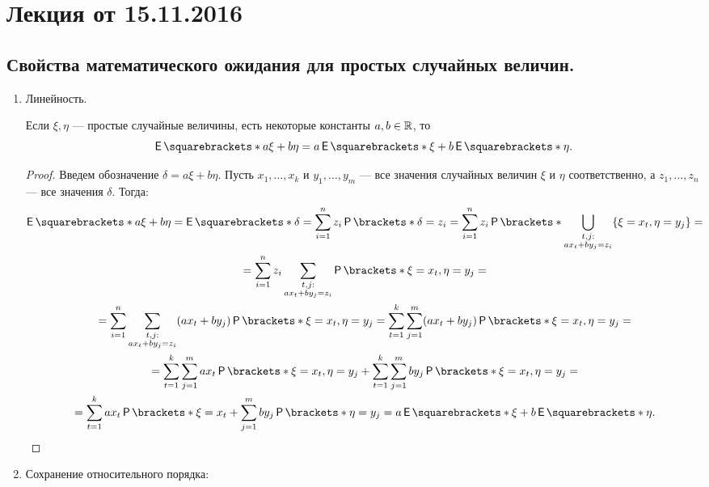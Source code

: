 \section {Лекция от 15.11.2016}

\subsection{Свойства математического ожидания для простых случайных величин.}

\begin{enumerate}
    \item Линейность. \par
    Если $ \xi, \eta $ --- простые случайные величины, есть некоторые константы $ a, b \in \mathbb{R} $, то 
    \[
        \E{a\xi + b\eta} = a\E{\xi} + b\E{\eta}.
    \] 
        \begin{proof}
            Введем обозначение \(\delta = a\xi + b\eta \).
            Пусть \(x_1, \ldots, x_k \) и \(y_1, \ldots, y_m \) --- все значения случайных величин $ \xi $ и $ \eta $ соответственно, а \(z_1, \ldots, z_n \) --- все значения $ \delta $. Тогда:
            \begin{multline*}
                \E{a\xi + b\eta} = \E{\delta} = \sum\limits_{i = 1}^{n}z_i\Pr{\delta = z_i} = \sum\limits_{i = 1}^{n}z_i
                \Pr{\bigcup\limits_{\substack{t, j:\\ ax_t + by_j = z_i}}\{\xi = x_t, \eta = y_j \}} = \\ =
                \sum\limits_{i = 1}^{n}z_i\sum\limits_{\substack{t, j:\\ ax_t + by_j = z_i}}\Pr{\xi = x_t, \eta = y_j} = \\ =
                \sum\limits_{i = 1}^{n}\sum\limits_{\substack{t, j:\\ ax_t + by_j = z_i}}(ax_t + by_j)\Pr{\xi = x_t, \eta = y_j} = 
                \sum\limits_{t = 1}^{k}\sum\limits_{j = 1}^{m}(ax_t + by_j)\Pr{\xi = x_t, \eta = y_j} = \\ =
                \sum\limits_{t = 1}^{k}\sum\limits_{j = 1}^{m}ax_t\Pr{\xi = x_t, \eta = y_j} +
                \sum\limits_{t = 1}^{k}\sum\limits_{j = 1}^{m}by_j\Pr{\xi = x_t, \eta = y_j} = \\ =
                \sum\limits_{t = 1}^{k}ax_t\Pr{\xi = x_t} + \sum\limits_{j = 1}^{m}by_j\Pr{\eta = y_j} = a\E{\xi} + b\E{\eta}.
            \end{multline*}
        \end{proof}
    \item Сохранение относительного порядка: \par

\end{enumerate}
